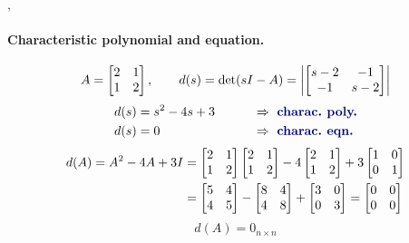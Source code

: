 \sep
\paragraph{Characteristic polynomial and equation.}
\[
A=\begin{bmatrix}2&1\\1&2\end{bmatrix},\qquad
d(s)=\det(sI-A)=\left|\begin{bmatrix}s-2&-1\\-1&s-2\end{bmatrix}\right|
\]
\begin{alignat*}{2}
d(s)&=s^2-4s+3 &\qquad&\Rightarrow\ \text{\term{charac.\ poly.}}\\
d(s)&=0 &&\Rightarrow\ \text{\term{charac.\ eqn.}}
\end{alignat*}
\begin{align*}
d(A)=A^2-4A+3I &= \begin{bmatrix}2&1\\1&2\end{bmatrix}\begin{bmatrix}2&1\\1&2\end{bmatrix}-4\begin{bmatrix}2&1\\1&2\end{bmatrix}+3\begin{bmatrix}1&0\\0&1\end{bmatrix}\\
&= \begin{bmatrix}5&4\\4&5\end{bmatrix}-\begin{bmatrix}8&4\\4&8\end{bmatrix}+\begin{bmatrix}3&0\\0&3\end{bmatrix}=\begin{bmatrix}0&0\\0&0\end{bmatrix}
\end{align*}
\[
\boxed{d(A)=0_{n\times n}}
\]

